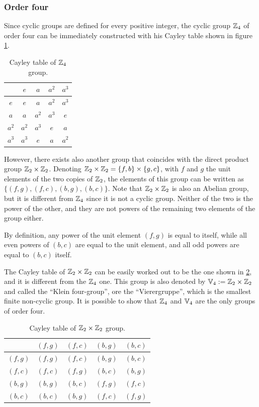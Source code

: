 \subsubsection{Order four}
Since cyclic groups are defined for every positive integer, the cyclic group $\mathbb{Z}_4$ of order four can be immediately constructed with his Cayley table shown in figure \ref{tab: Z4 Cayley table}.
\begin{table}[H]
    \centering
    \begin{tabular}{|c|cccc|}
        \hline 
         & $e$ & $a$ & $a^2$ & $a^3$ \\ \hline
         $e$ & $e$ & $a$ & $a^2$ & $a^3$ \\ 
         $a$ & $a$ & $a^2$ & $a^3$ & $e$ \\
         $a^2$ & $a^2$ & $a^3$ & $e$ & $a$ \\ 
         $a^3$ & $a^3$ & $e$ & $a$ & $a^2$ \\ \hline
    \end{tabular}
    \caption{Cayley table of $\mathbb{Z}_4$ group.}
    \label{tab: Z4 Cayley table}
\end{table}

However, there exists also another group that coincides with the direct product group $\mathbb{Z}_2 \times \mathbb{Z}_2$. Denoting $\mathbb{Z}_2 \times \mathbb{Z}_2 = \{f,b\} \times \{g,c\}$, with $f$ and $g$ the unit elements of the two copies of $\mathbb{Z}_2$, the elements of this group can be written as $\{(f,g),(f,c),(b,g),(b,c)\}$. Note that $\mathbb{Z}_2 \times \mathbb{Z}_2$ is also an Abelian group, but it is different from $\mathbb{Z}_4$ since it is not a cyclic group. Neither of the two is the power of the other, and they are not powers of the remaining two elements of the group either.
\begin{obs}
    By definition, any power of the unit element $(f,g)$ is equal to itself, while all even powers of $(b,c)$ are equal to the unit element, and all odd powers are equal to $(b,c)$ itself.
\end{obs}
The Cayley table of $\mathbb{Z}_2 \times \mathbb{Z}_2$ can be easily worked out to be the one shown in \ref{tab: Z2 X Z2 Cayley table}, and it is different from the $\mathbb{Z}_4$ one. This group is also denoted by $\mathbb{V}_4 := \mathbb{Z}_2 \times \mathbb{Z}_2$ and called the ``Klein four-group'', ore the ``Vierergruppe'', which is the smallest finite non-cyclic group. It is possible to show that $\mathbb{Z}_4$ and $\mathbb{V}_4$ are the only groups of order four.
\begin{table}[h]
    \centering
    \begin{tabular}{|c|cccc|}
        \hline 
         & $(f,g)$ & $(f,c)$ & $(b,g)$ & $(b,c)$ \\ \hline
         $(f,g)$ & $(f,g)$ & $(f,c)$ & $(b,g)$ & $(b,c)$ \\ 
         $(f,c)$ & $(f,c)$ & $(f,g)$ & $(b,c)$ & $(b,g)$ \\
         $(b,g)$ & $(b,g)$ & $(b,c)$ & $(f,g)$ & $(f,c)$ \\ 
         $(b,c)$ & $(b,c)$ & $(b,g)$ & $(f,c)$ & $(f,g)$ \\ \hline
    \end{tabular}
    \caption{Cayley table of $\mathbb{Z}_2 \times \mathbb{Z}_2$ group.}
    \label{tab: Z2 X Z2 Cayley table}
\end{table}

